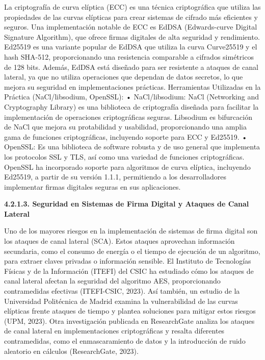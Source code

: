 \documentclass{amsart}
\begin{document}
    La criptografía de curva elíptica (ECC) es una técnica criptográfica que utiliza las propiedades de las curvas elípticas para crear sistemas de cifrado más eficientes y seguros. Una implementación notable de ECC es EdDSA (Edwards-curve Digital Signature Algorithm), que ofrece firmas digitales de alta seguridad y rendimiento.
    Ed25519 es una variante popular de EdDSA que utiliza la curva Curve25519 y el hash SHA-512, proporcionando una resistencia comparable a cifrados simétricos de 128 bits. Además, EdDSA está diseñado para ser resistente a ataques de canal lateral, ya que no utiliza operaciones que dependan de datos secretos, lo que mejora su seguridad en implementaciones prácticas.
    Herramientas Utilizadas en la Práctica (NaCl/libsodium, OpenSSL):
        •	NaCl/libsodium: NaCl (Networking and Cryptography Library) es una biblioteca de criptografía diseñada para facilitar la implementación de operaciones criptográficas seguras. Libsodium es bifurcación de NaCl que mejora su protabilidad y usabilidad, proporcionando una amplia gama de funciones criptográficas, incluyendo soporte para ECC y Ed25519.
        •	OpenSSL: Es una biblioteca de software robusta y de uso general que implementa los protocolos SSL y TLS, así como una variedad de funciones criptográficas. OpenSSL ha incorporado soporte para algoritmos de curva elíptica, incluyendo Ed25519, a partir de su versión 1.1.1, permitiendo a los desarrolladores implementar firmas digitales seguras en sus aplicaciones.
    
        
    \textbf{ 4.2.1.3. Seguridad en Sistemas de Firma Digital y Ataques de Canal Lateral }
    
    Uno de los mayores riesgos en la implementación de sistemas de firma digital son los ataques de canal lateral (SCA). Estos ataques aprovechan información secundaria, como el consumo de energía o el tiempo de ejecución de un algoritmo, para extraer claves privadas o información sensible.
    El Instituto de Tecnologías Físicas y de la Información (ITEFI) del CSIC ha estudiado cómo los ataques de canal lateral afectan la seguridad del algoritmo AES, proporcionando contramedidas efectivas (ITEFI-CSIC, 2023). Así también, un estudio de la Universidad Politécnica de Madrid examina la vulnerabilidad de las curvas elípticas frente ataques de tiempo y plantea soluciones para mitigar estos riesgos (UPM, 2023).
    Otra investigación publicada en ResearchGate analiza los ataques de canal lateral en implementaciones criptográficas y resalta diferentes contramedidas, como el enmascaramiento de datos y la introducción de ruido aleatorio en cálculos (ResearchGate, 2023).
    
\end{document}
